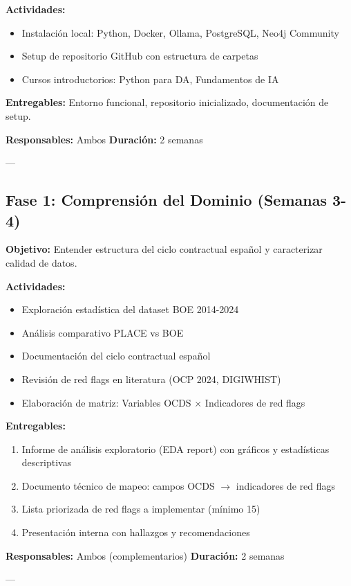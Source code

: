\documentclass[11pt,a4paper,spanish]{book}
\numberwithin{equation}{chapter}
\numberwithin{figure}{chapter}
\begin{document}
\textbf{Actividades:}
\begin{itemize}
\item Instalación local: Python, Docker, Ollama, PostgreSQL, Neo4j Community
\item Setup de repositorio GitHub con estructura de carpetas
\item Cursos introductorios: Python para DA, Fundamentos de IA
\end{itemize}

\textbf{Entregables:} Entorno funcional, repositorio inicializado, documentación de setup.

\textbf{Responsables:} Ambos
\textbf{Duración:} 2 semanas

---

\subsection{Fase 1: Comprensión del Dominio (Semanas 3-4)}

\textbf{Objetivo:} Entender estructura del ciclo contractual español y caracterizar calidad de datos.

\textbf{Actividades:}
\begin{itemize}
\item Exploración estadística del dataset BOE 2014-2024
\item Análisis comparativo PLACE vs BOE
\item Documentación del ciclo contractual español
\item Revisión de red flags en literatura (OCP 2024, DIGIWHIST)
\item Elaboración de matriz: Variables OCDS $\times$ Indicadores de red flags
\end{itemize}

\textbf{Entregables:}
\begin{enumerate}
\item Informe de análisis exploratorio (EDA report) con gráficos y estadísticas descriptivas
\item Documento técnico de mapeo: campos OCDS $\rightarrow$ indicadores de red flags
\item Lista priorizada de red flags a implementar (mínimo 15)
\item Presentación interna con hallazgos y recomendaciones
\end{enumerate}

\textbf{Responsables:} Ambos (complementarios)
\textbf{Duración:} 2 semanas

---
\end{document}
